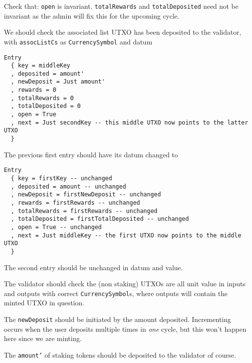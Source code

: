 \documentclass[10pt, a4paper]{article}
\theoremstyle{definition}
\begin{document}
\begin{enumerate}
{Check that: \texttt{open} is invariant. \texttt{totalRewards} and \texttt{totalDeposited} need not be invariant as the admin will fix this for the upcoming cycle.

 We should check the associated list UTXO has been deposited to the validator, with \texttt{assocListCs} as \texttt{CurrencySymbol} and datum
\begin{verbatim}
Entry  
  { key = middleKey
  , deposited = amount'
  , newDeposit = Just amount'
  , rewards = 0
  , totalRewards = 0
  , totalDeposited = 0
  , open = True
  , next = Just secondKey -- this middle UTXO now points to the latter UTXO
  }
\end{verbatim}

The previous first entry should have its datum changed to \begin{verbatim}
Entry
  { key = firstKey -- unchanged
  , deposited = amount -- unchanged
  , newDeposit = firstNewDeposit -- unchanged
  , rewards = firstRewards -- unchanged
  , totalRewards = firstRewards -- unchanged
  , totalDeposited = firstTotalDeposited -- unchanged
  , open = True -- unchanged
  , next = Just middleKey -- the first UTXO now points to the middle UTXO
  }
\end{verbatim}

The second entry should be unchanged in datum and value.

The validator should check the (non staking) UTXOs are all unit value in inputs and outputs with correct \texttt{CurrencySymbol}s, where outputs will contain the minted UTXO in question.

The \texttt{newDeposit} should be initiated by the amount deposited. Incrementing occurs when the user deposits multiple times in \textit{one} cycle, but this won't happen here since we are minting.

The \texttt{amount'} of staking tokens should be deposited to the validator of course.
}
\end{enumerate}
\end{document}

